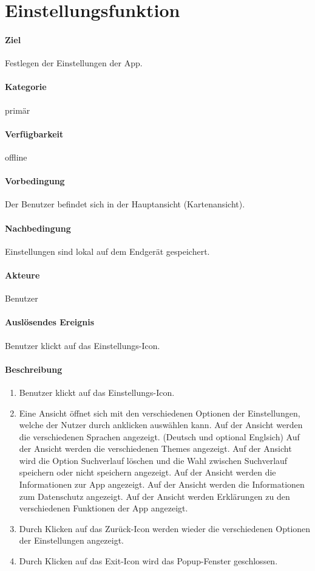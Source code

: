 \section{Einstellungsfunktion}
\paragraph{Ziel}
Festlegen der Einstellungen der App.
\paragraph{Kategorie}
primär
\paragraph{Verfügbarkeit}
offline
\paragraph{Vorbedingung}
Der Benutzer befindet sich in der Hauptansicht (Kartenansicht).
\paragraph{Nachbedingung}
Einstellungen sind lokal auf dem Endgerät gespeichert.
\paragraph{Akteure}
Benutzer
\paragraph{Auslösendes Ereignis}
Benutzer klickt auf das Einstellungs-Icon.
\paragraph{Beschreibung}
\begin{enumerate}
    \item Benutzer klickt auf das Einstellungs-Icon.
    \item Eine Ansicht öffnet sich mit den verschiedenen Optionen der Einstellungen, welche der Nutzer durch anklicken auswählen kann.
     Auf der Ansicht werden die verschiedenen Sprachen angezeigt. (Deutsch und optional Englsich)
     Auf der Ansicht werden die verschiedenen Themes angezeigt.
     Auf der Ansicht wird die Option Suchverlauf löschen und die Wahl zwischen Suchverlauf speichern oder nicht speichern angezeigt.
     Auf der Ansicht werden die Informationen zur App angezeigt.
     Auf der Ansicht werden die Informationen zum Datenschutz angezeigt.
     Auf der Ansicht werden Erklärungen zu den verschiedenen Funktionen der App angezeigt.
    \item Durch Klicken auf das Zurück-Icon werden wieder die verschiedenen Optionen der Einstellungen angezeigt.
    \item Durch Klicken auf das Exit-Icon wird das Popup-Fenster geschlossen.
\end{enumerate}